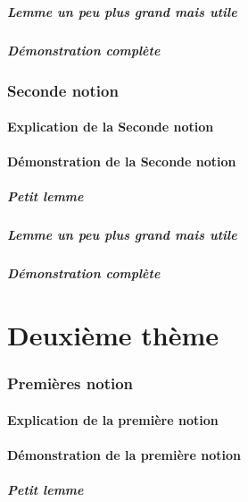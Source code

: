 \documentclass[a4paper,autre]{../texmf/tex/latex/insa/insa}
\begin{document}
				\subsubsection{Lemme un peu plus grand mais utile}
					\lipsum[1-4]
				\subsubsection{Démonstration complète}
					\lipsum[1-5]
		\section{Seconde notion}
			\lipsum[1-2]
			\subsection{Explication de la Seconde notion}
				\lipsum[1-5]
			\subsection{Démonstration de la Seconde notion}
				\subsubsection{Petit lemme}
					\lipsum[1-2]
				\subsubsection{Lemme un peu plus grand mais utile}
					\lipsum[1-4]
				\subsubsection{Démonstration complète}
					\lipsum[1-5]
	\part{Deuxième thème}
		\section{Premières notion}
				\lipsum[1-2]
			\subsection{Explication de la première notion}
				\lipsum[1-5]
			\subsection{Démonstration de la première notion}
				\subsubsection{Petit lemme}
					\lipsum[1-2]
\end{document}
